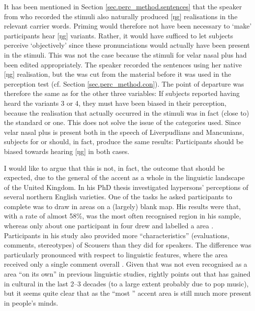 It has been mentioned in Section \ref{sec.perc_method.sentences} that the speaker from  who recorded the stimuli also naturally produced [ŋg] realisations in the relevant carrier words.
Priming would therefore not have been necessary to `make' participants hear [ŋg] variants.
Rather, it would have sufficed to let subjects perceive `objectively' since these pronunciations would actually have been present in the stimuli.
This was not the case because the stimuli for velar nasal plus had been edited appropriately.
The speaker recorded the sentences using her native [ŋg] realisation, but the  was cut from the material before it was used in the perception test (cf. Section \ref{sec.perc_method.con}).
The point of departure was therefore the same as for the other three variables: If subjects reported having heard the  variants 3 or 4, they must have been biased in their perception, because the realisation that actually occurred in the stimuli was in fact (close to) the standard or  one.
This does not solve the issue of the  categories used.
Since velar nasal plus is present both in the speech of Liverpudlians and Mancunians,  subjects for  or  should, in fact, produce the same results: Participants should be biased towards hearing [ŋg] in both cases.

I would like to argue that this is not, in fact, the outcome that should be expected, due to the general  of the  accent as a whole in the linguistic landscape of the United Kingdom.
In his \citeyear{montgomery2007} PhD thesis \citeauthor{montgomery2007} investigated laypersons' perceptions of several northern English varieties.
One of the tasks he asked participants to complete was to draw in  areas on a (largely) blank map.
His results were that, with a rate of almost 58\%,  was the most often recognised  region in his sample, whereas only about one participant in four drew and labelled a  area \parencite[cf.][194]{montgomery2007}.
Participants in his study also provided more ``characteristics'' (evaluations, comments, stereotypes) of Scousers than they did for  speakers.
The difference was particularly pronounced with respect to linguistic features, where the  area received only a single comment overall \parencite[cf.][246--252]{montgomery2007}.
Given that  was not even recognised as a  area ``on its own'' in previous linguistic studies, \textcite[cf.][214--215]{montgomery2007} rightly points out that  has gained in cultural  in the last 2--3 decades (to a large extent probably due to pop music), but it seems quite clear that  as the ``most '' \parencite[216]{montgomery2007} accent area is still much more present in people's minds.

